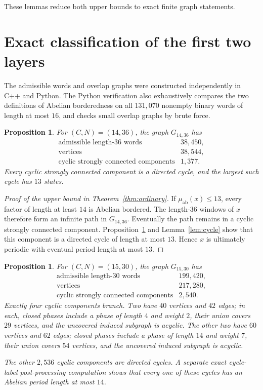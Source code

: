 \documentclass[11pt]{article}
\newtheorem{proposition}[theorem]{Proposition}
\begin{document}
These lemmas reduce both upper bounds to exact finite graph statements.

\section{Exact classification of the first two layers}

The admissible words and overlap graphs were constructed independently in
C++ and Python. The Python verification also exhaustively compares the two
definitions of Abelian borderedness on all $131{,}070$ nonempty binary words
of length at most $16$, and checks small overlap graphs by brute force.

\begin{proposition}\label{prop:c14}
For $(C,N)=(14,36)$, the graph $G_{14,36}$ has
\[
\begin{array}{lr}
\text{admissible length-36 words} & 38{,}450,\\
\text{vertices} & 38{,}544,\\
\text{cyclic strongly connected components} & 1{,}377.
\end{array}
\]
Every cyclic strongly connected component is a directed cycle, and the
largest such cycle has $13$ states.
\end{proposition}

\begin{proof}[Proof of the upper bound in Theorem~\ref{thm:ordinary}]
If $\mu_{\mathrm{ab}}(x)\le13$, every factor of length at least $14$ is
Abelian bordered. The length-$36$ windows of $x$ therefore form an infinite
path in $G_{14,36}$. Eventually the path remains in a cyclic strongly
connected component. Proposition~\ref{prop:c14} and Lemma~\ref{lem:cycle}
show that this component is a directed cycle of length at most $13$. Hence
$x$ is ultimately periodic with eventual period length at most $13$.
\end{proof}

\begin{proposition}\label{prop:c15}
For $(C,N)=(15,30)$, the graph $G_{15,30}$ has
\[
\begin{array}{lr}
\text{admissible length-30 words} & 199{,}420,\\
\text{vertices} & 217{,}280,\\
\text{cyclic strongly connected components} & 2{,}540.
\end{array}
\]
Exactly four cyclic components branch. Two have $40$ vertices and $42$
edges; in each, closed phases include a phase of length $4$ and weight $2$,
their union covers $29$ vertices, and the uncovered induced subgraph is
acyclic. The other two have $60$ vertices and $62$ edges; closed phases
include a phase of length $14$ and weight $7$, their union covers $54$
vertices, and the uncovered induced subgraph is acyclic.

The other $2{,}536$ cyclic components are directed cycles. A separate exact
cycle-label post-processing computation shows that every one of these cycles
has an Abelian period length at most $14$.
\end{proposition}
\end{document}
